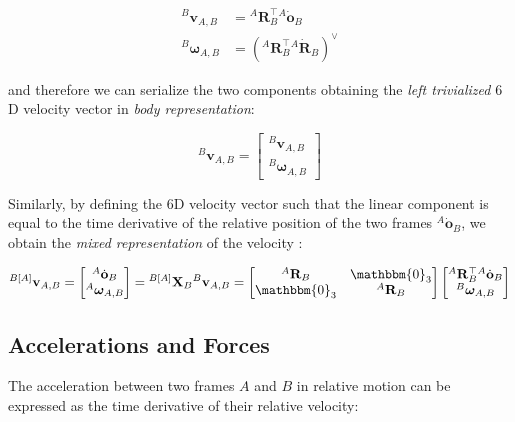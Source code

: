 \begin{align}
    {}^B\bm{v}_{A,B} & = {}^A\mathbf{R}_B^\top {}^A\dot{\mathbf{o}}_B                              \\
    {}^B\boldsymbol{\omega}_{A,B} & = \left({}^A\mathbf{R}_B^\top {}^A\dot{\mathbf{R}}_B \right)^\vee \nonumber
\end{align}

and therefore we can serialize the two components obtaining the \textit{left trivialized} $6$D velocity vector in \textit{body representation}:

\begin{equation}
    \label{eqn:left_trivialized}
    {}^B\mathbf{v}_{A,B} = \begin{bmatrix}
        {}^B\bm{v}_{A,B} \\
        {}^B\boldsymbol{\omega}_{A,B}
    \end{bmatrix}
\end{equation}

Similarly, by defining the $6$D velocity vector such that the linear component is equal to the time derivative of the relative position of the two frames ${}^A\dot{\mathbf{o}}_B$, we obtain the \textit{mixed representation} of the velocity \citep{traversaro_modelling_2019}:

\begin{equation}
    {}^{B[A]}\mathbf{v} _{A,B} =
    \begin{bmatrix}
        {}^A \dot{\mathbf{o}} _B \\
        {}^A \boldsymbol{\omega}_{A,B}
    \end{bmatrix} =
    {}^{B[A]} \mathbf{X}_{B} {}^B\mathbf{v}_{A,B}=
    \begin{bmatrix}
        {}^A \mathbf{R}_B & \mathbbm{0}_3    \\
        \mathbbm{0}_3     & {}^A\mathbf{R}_B
    \end{bmatrix}
    \begin{bmatrix}
        {}^A\mathbf{R}_B ^\top {}^A\dot{\mathbf{o}}_B \\
        {}^B\boldsymbol{\omega}_{A,B}
    \end{bmatrix}
\end{equation}

\subsection{Accelerations and Forces}

The acceleration between two frames $A$ and $B$ in relative motion can be expressed as the time derivative of their relative velocity:

